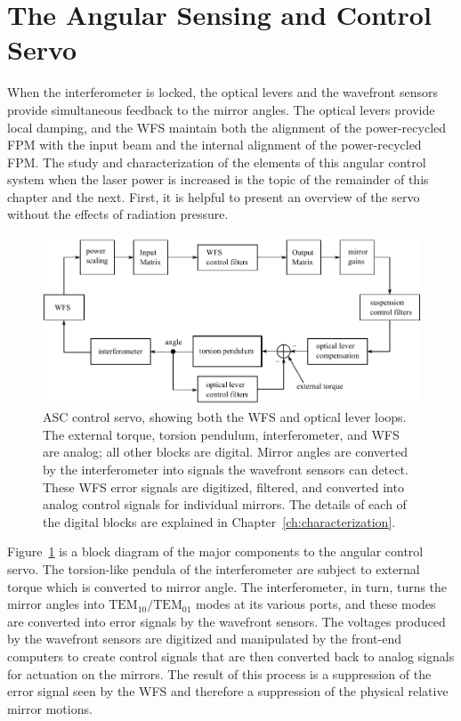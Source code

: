 \section{The Angular Sensing and Control Servo}
When the interferometer is locked, the optical levers and the wavefront sensors provide simultaneous feedback to the mirror angles. The optical levers provide local damping, and the WFS maintain both the alignment of the power-recycled FPM with the input beam and the internal alignment of the power-recycled FPM. The study and characterization of the elements of this angular control system when the laser power is increased is the topic of the remainder of this chapter and the next. First, it is helpful to present an overview of the servo without the effects of radiation pressure.

\begin{figure} \begin{centering} 
\includegraphics{figures/ASCcontrolservo.pdf} 
\caption[ASC control servo]{ASC control servo, showing both the WFS and optical lever loops. The external torque, torsion pendulum, interferometer, and WFS are analog; all other blocks are digital. Mirror angles are converted by the interferometer into signals the wavefront sensors can detect. These WFS error signals are digitized, filtered, and converted into analog control signals for individual mirrors. The details of each of the digital blocks are explained in Chapter~\ref{ch:characterization}.}
\label{fig:ASCcontrolservo}
\end{centering}
\end{figure}

Figure~\ref{fig:ASCcontrolservo} is a block diagram of the major components to the angular control servo. The torsion-like pendula of the interferometer are subject to external torque which is converted to mirror angle. The interferometer, in turn, turns the mirror angles into $\mathrm{TEM}_{10}/\mathrm{TEM}_{01}$ modes at its various ports, and these modes are converted into error signals by the wavefront sensors. The voltages produced by the wavefront sensors are digitized and manipulated by the front-end computers to create control signals that are then converted back to analog signals for actuation on the mirrors. The result of this process is a suppression of the error signal seen by the WFS and therefore a suppression of the physical relative mirror motions. 



